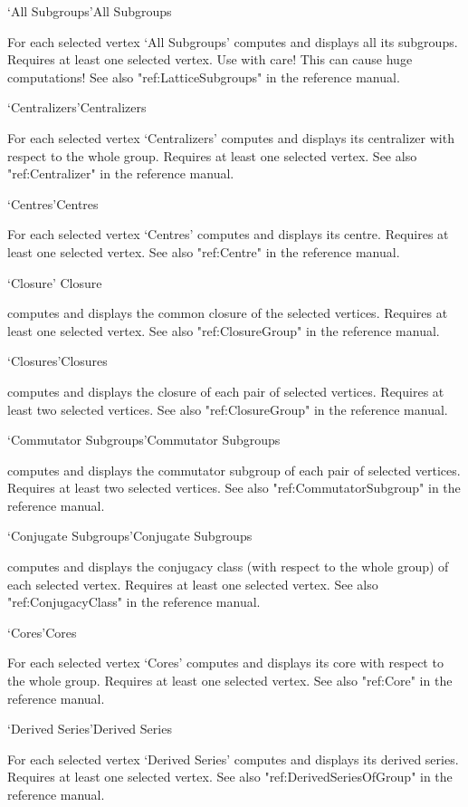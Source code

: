 \>`All Subgroups'{All Subgroups}

For each selected vertex `All Subgroups' computes and displays all its
subgroups. Requires at least one selected vertex. Use with care! This can
cause huge computations!  See also "ref:LatticeSubgroups" in the {\GAP}
reference manual.

\>`Centralizers'{Centralizers}

For each selected vertex `Centralizers' computes and displays its
centralizer with respect to the whole group.  Requires at least one
selected vertex.  See also "ref:Centralizer" in the {\GAP}
reference manual.

\>`Centres'{Centres}

For each selected vertex `Centres' computes and displays its centre.
Requires at least one selected vertex. See also "ref:Centre" in the {\GAP}
reference manual.

\>`Closure' {Closure}

computes and displays the common closure of the selected vertices.
Requires at least one selected vertex. See also "ref:ClosureGroup" in the
{\GAP} reference manual.

\>`Closures'{Closures}

computes and displays the closure of each pair of selected vertices.
Requires at least two selected vertices. See also "ref:ClosureGroup" in the
{\GAP} reference manual.

\>`Commutator Subgroups'{Commutator Subgroups}

computes and displays  the commutator  subgroup of each pair of selected
vertices.    Requires  at  least    two   selected  vertices. See    also
"ref:CommutatorSubgroup" in the {\GAP}
reference manual.

\>`Conjugate Subgroups'{Conjugate Subgroups}

computes and displays the conjugacy  class (with  respect to the  whole
group) of each  selected vertex.  Requires  at least one selected vertex.
See also "ref:ConjugacyClass" in the {\GAP}
reference manual.

\>`Cores'{Cores}

For each selected vertex `Cores' computes and displays its core with
respect to the whole group.  Requires at least one selected vertex. See
also "ref:Core" in the {\GAP}
reference manual.

\>`Derived Series'{Derived Series}

For   each  selected vertex  `Derived  Series'  computes and displays its
derived series.   Requires  at   least  one selected vertex.    See  also
"ref:DerivedSeriesOfGroup" in the {\GAP}
reference manual.

